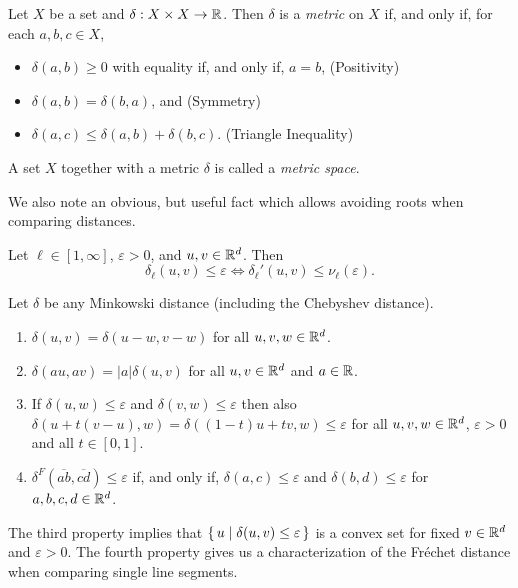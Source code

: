 \begin{definition}\label{def:metric}
  Let \(X\) be a set and \(\delta:X\times X \to \mathbb{R}\). Then \(\delta\) is a \emph{metric} on \(X\) if, and only if, for each \(a, b, c \in X\), 
  \begin{itemize}
    \item \(\delta(a, b) \geq 0\) with equality if, and only if, \(a = b\), \hfill (Positivity)
    \item \(\delta(a, b) = \delta(b, a)\), and \hfill (Symmetry)
    \item \(\delta(a, c) \leq \delta(a, b) + \delta(b, c)\). \hfill (Triangle Inequality)
  \end{itemize}

  A set \(X\) together with a metric \(\delta\) is called a \emph{metric space}.
\end{definition}

We also note an obvious, but useful fact which allows avoiding roots when comparing distances. 
\begin{observation}\label{obs:unnormalize}
  Let \(\ell \in [1, \infty]\), \(\varepsilon > 0\), and \(u, v \in \mathbb{R}^d\). Then 
    \[\delta_\ell(u, v) \leq \varepsilon \iff \delta_\ell'(u, v) \leq \nu_\ell(\varepsilon).\]
\end{observation}


\begin{lemma}\label{lem:distance_properties}
  Let \(\delta\) be any Minkowski distance (including the Chebyshev distance).
  \begin{enumerate}
    \item \(\delta(u, v) = \delta(u - w, v - w)\) for all \(u, v, w\in \mathbb{R}^d\).
    \item \(\delta(a u, a v) = |a| \delta(u, v)\) for all \(u, v\in \mathbb{R}^d\)  and \(a \in \mathbb{R}\).
    \item If \(\delta(u, w) \leq \varepsilon\) and \(\delta(v, w) \leq \varepsilon\) then also \(\delta(u + t(v-u), w) = \delta((1-t)u + tv, w) \leq \varepsilon\) for all \(u, v, w\in \mathbb{R}^d\), \(\varepsilon > 0\) and all \(t \in [0, 1]\).
    \item \(\delta^F(\overline{ab}, \overline{cd}) \leq \varepsilon\) if, and only if, \(\delta(a, c) \leq \varepsilon\) and \(\delta(b, d) \leq \varepsilon\) for \(a,b,c,d \in \mathbb{R}^d\).
  \end{enumerate}
\end{lemma}

The third property implies that \(\set{u \mid \delta(u, v) \leq \varepsilon }\) is a convex set for fixed \(v \in \mathbb{R}^d\) and \(\varepsilon >0 \).
The fourth property gives us a characterization of the Fréchet distance when comparing single line segments. 

